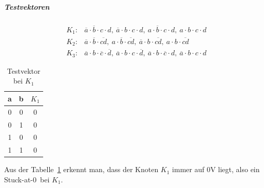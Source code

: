 \documentclass[10pt]{scrreprt}
\begin{document}
    \subparagraph{Testvektoren}
    \begin{eqnarray*}
        &K_1:& \overline{a} \cdot \overline{b} \cdot c \cdot d,\ \overline{a} \cdot b \cdot c \cdot d,\ a \cdot \overline{b} \cdot c \cdot d,\ a \cdot b \cdot c \cdot d\\
        &K_2:& \overline{a} \cdot \overline{b} \cdot \overline{cd},\ a \cdot \overline{b} \cdot \overline{cd},\ \overline{a} \cdot b \cdot \overline{cd},\ a \cdot b \cdot \overline{cd}\\
        &K_3:& \overline{a} \cdot b \cdot \overline{c} \cdot \overline{d},\ \overline{a} \cdot b \cdot c \cdot \overline{d},\ \overline{a} \cdot b \cdot \overline{c} \cdot d,\ \overline{a} \cdot b \cdot c \cdot d
    \end{eqnarray*}

    \begin{table}[H]
        \centering
        \begin{tabular}{cc|c}
            \toprule
            a & b & $K_1$\\
            \midrule
            0 & 0 & 0\\
            0 & 1 & 0\\
            1 & 0 & 0\\
            1 & 1 & 0\\
            \bottomrule
        \end{tabular}
        \caption{Testvektor bei $K_1$}
        \label{tab:TestVK1}
    \end{table}

    Aus der Tabelle~\ref{tab:TestVK1} erkennt man, dass der Knoten $K_1$ immer auf 0V liegt, also
    ein \glqq Stuck-at-0\grqq~bei $K_1$.
\end{document}
